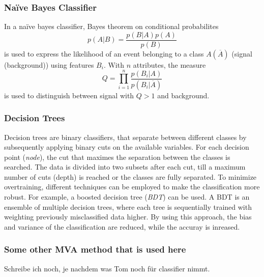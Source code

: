 \subsubsection{Na\"ive Bayes Classifier}
\label{subsec:Bayes}
In a na\"ive bayes classifier, Bayes theorem on conditional probabilites
\begin{equation}
    p(A|B) = \frac{p(B|A)p(A)}{p(B)}
    \label{eq:Bayes}
\end{equation}
is used to express the likelihood of an event belonging to a class $A(\overline{A})$ (signal (background)) using features $B_i$.
With $n$ attributes, the measure 
\begin{equation}
    Q = \prod_{i=1}^{n} \frac{p(B_i|A)}{p(B_i|\overline{A})}
\end{equation}
is used to distinguish between signal with $Q > 1$ and background.

\subsubsection{Decision Trees}
Decision trees are binary classifiers, that separate between different classes by subsequently applying binary cuts on the available variables. 
For each decision point (\textit{node}), the cut that maximes the separation between the classes is searched. The data is divided into two subsets after each cut, till a
maximum number of cuts (depth) is reached or the classes are fully separated.
To minimize overtraining, different techniques can be employed to make the classification more robust. For example, a boosted decision tree (\textit{BDT}) can be used.
A BDT is an ensemble of multiple decision trees, where each tree is sequentially trained with weighting previously misclassified data higher. By using this approach, 
the bias and variance of the classification are reduced, while the accuray is inreased.

\subsubsection{Some other MVA method that is used here}
Schreibe ich noch, je nachdem was Tom noch für classifier nimmt.

